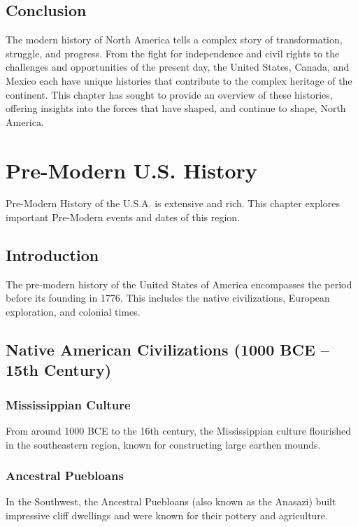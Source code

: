 \documentclass[a4paper,12pt]{book}
\begin{document}
\section{Conclusion}
\label{sec:conclusion-north-america-modern}
The modern history of North America tells a complex story of transformation, struggle, and progress. From the fight for independence and civil rights to the challenges and opportunities of the present day, the United States, Canada, and Mexico each have unique histories that contribute to the complex heritage of the continent. This chapter has sought to provide an overview of these histories, offering insights into the forces that have shaped, and continue to shape, North America.

\chapter{Pre-Modern U.S. History}
\label{ch:pre-modern-us-history}

Pre-Modern History of the U.S.A. is extensive and rich. This chapter explores important Pre-Modern events and dates of this region.

\section{Introduction}
\label{sec:introduction-pre-modern-usa}
The pre-modern history of the United States of America encompasses the period before its founding in 1776. This includes the native civilizations, European exploration, and colonial times.

\section{Native American Civilizations (1000 BCE – 15th Century)}
\label{sec:native-american-civilizations}
\subsection{Mississippian Culture}
\label{subsec:mississippian-culture}
From around 1000 BCE to the 16th century, the Mississippian culture flourished in the southeastern region, known for constructing large earthen mounds.

\subsection{Ancestral Puebloans}
\label{subsec:ancestral-puebloans}
In the Southwest, the Ancestral Puebloans (also known as the Anasazi) built impressive cliff dwellings and were known for their pottery and agriculture.
\end{document}
